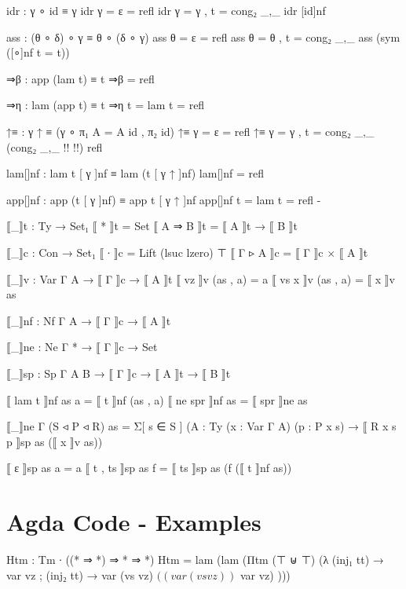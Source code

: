 \begin{code}
{idr : γ ∘ id ≡ γ
idr {γ = ε} = refl
idr {γ = γ , t} = cong₂ _,_ idr [id]nf

ass : (θ ∘ δ) ∘ γ ≡ θ ∘ (δ ∘ γ)
ass {θ = ε} = refl
ass {θ = θ , t} = cong₂ _,_ ass (sym ([∘]nf {t = t}))

⇒β : app (lam t) ≡ t
⇒β = refl

⇒η : lam (app t) ≡ t
⇒η {t = lam t} = refl

↑≡ : γ ↑ ≡ (γ ∘ π₁ {A = A} id , π₂ id)
↑≡ {γ = ε} = refl
↑≡ {γ = γ , t} = cong₂ _,_ (cong₂ _,_ {!!} {!!}) refl

lam[]nf : lam t [ γ ]nf ≡ lam (t [ γ ↑ ]nf)
lam[]nf = refl

app[]nf : app (t [ γ ]nf) ≡ app t [ γ ↑ ]nf
app[]nf {t = lam t} = refl
-}


⟦_⟧t : Ty → Set₁
⟦ * ⟧t = Set
⟦ A ⇒ B ⟧t = ⟦ A ⟧t → ⟦ B ⟧t

⟦_⟧c : Con → Set₁
⟦ ∙ ⟧c = Lift (lsuc lzero) ⊤
⟦ Γ ▹ A ⟧c = ⟦ Γ ⟧c × ⟦ A ⟧t

⟦_⟧v : Var Γ A → ⟦ Γ ⟧c → ⟦ A ⟧t
⟦ vz ⟧v (as , a) = a
⟦ vs x ⟧v (as , a) = ⟦ x ⟧v as

⟦_⟧nf : Nf Γ A → ⟦ Γ ⟧c → ⟦ A ⟧t

⟦_⟧ne : Ne Γ * → ⟦ Γ ⟧c → Set

⟦_⟧sp : Sp Γ A B → ⟦ Γ ⟧c → ⟦ A ⟧t → ⟦ B ⟧t

⟦ lam t ⟧nf as a = ⟦ t ⟧nf (as , a)
⟦ ne spr ⟧nf as = ⟦ spr ⟧ne as

⟦_⟧ne {Γ} (S ◃ P ◃ R) as =
  Σ[ s ∈ S ] ({A : Ty} (x : Var Γ A) (p : P x s)
  → ⟦ R x s p ⟧sp as (⟦ x ⟧v as))

⟦ ε ⟧sp as a = a
⟦ t , ts ⟧sp as f = ⟦ ts ⟧sp as (f (⟦ t ⟧nf as))

\end{code}

\section{Agda Code - Examples}


\label{Htm}

\begin{code}
Htm : Tm ∙ ((* ⇒ *) ⇒ * ⇒ *)
Htm = lam (lam (Πtm (⊤ ⊎ ⊤) (λ
  { (inj₁ tt) → var vz
  ; (inj₂ tt) → var (vs vz) $ ((var (vs vz)) $ var vz)
  })))
\end{code}

